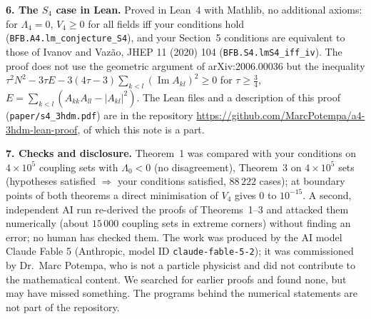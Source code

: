 \documentclass[11pt,a4paper]{article}
\begin{document}
\textbf{6. The $S_4$ case in Lean.} Proved in Lean~4 with Mathlib, no additional axioms: for $\Lambda_4=0$, $V_4\ge0$
for all fields iff your conditions hold (\texttt{BFB.A4.lm\_conjecture\_S4}), and your Section~5 conditions are equivalent
to those of Ivanov and Vaz\~ao, JHEP 11 (2020) 104 (\texttt{BFB.S4.lmS4\_iff\_iv}). The proof does not use the geometric argument of
arXiv:2006.00036 but the inequality $\tau^2N^2-3\tau E-3(4\tau-3)\sum_{k<l}(\operatorname{Im}A_{kl})^2\ge0$ for $\tau\ge\tfrac34$,
$E=\sum_{k<l}(A_{kk}A_{ll}-|A_{kl}|^2)$. The Lean files and a description of this proof (\texttt{paper/s4\_3hdm.pdf}) are in the repository
\url{https://github.com/MarcPotempa/a4-3hdm-lean-proof}, of which this note is a part.

\textbf{7. Checks and disclosure.} Theorem~1 was compared with your conditions on $4\times10^5$ coupling sets with
$\Lambda_0<0$ (no disagreement), Theorem~3 on $4\times10^5$ sets (hypotheses satisfied $\Rightarrow$ your conditions
satisfied, $88\,222$ cases); at boundary points of both theorems a direct minimisation of $V_4$ gives $0$ to $10^{-15}$.
A second, independent AI run re-derived the proofs of Theorems~1--3 and attacked them numerically (about $15\,000$
coupling sets in extreme corners) without finding an error; no human has checked them.
The work was produced by the AI model Claude Fable 5 (Anthropic, model ID \texttt{claude-fable-5-2}); it was
commissioned by Dr.~Marc Potempa, who is not a particle physicist and did not contribute to the mathematical content.
We searched for earlier proofs and found none, but may have missed something. The programs behind the numerical
statements are not part of the repository.
\end{document}
